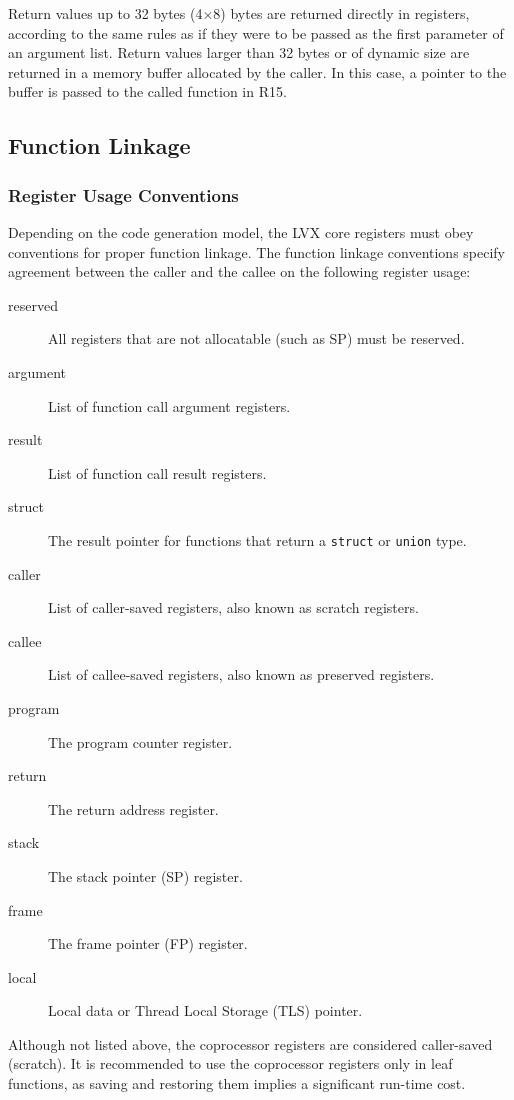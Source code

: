 Return values up to 32 bytes (4$\times$8) bytes are returned directly in
registers, according to the same rules as if they were to be passed as the first
parameter of an argument list. Return values larger than 32 bytes or of dynamic
size are returned in a memory buffer allocated by the caller. In this case, a
pointer to the buffer is passed to the called function in R15.


\subsection{Function Linkage}

\subsubsection{Register Usage Conventions}

Depending on the code generation model, the LVX core registers must
obey conventions for proper function linkage. The function linkage
conventions specify agreement between the caller and the callee on the following
register usage: \begin{description}
\item[reserved] All registers that are not allocatable (such as SP) must be reserved.
\item[argument] List of function call argument registers.
\item[result] List of function call result registers.
\item[struct] The result pointer for functions that return a \verb|struct| or \verb|union| type.
\item[caller] List of caller-saved registers, also known as scratch registers.
\item[callee] List of callee-saved registers, also known as preserved registers.
\item[program] The program counter register.
\item[return] The return address register.
\item[stack] The stack pointer (SP) register.
\item[frame] The frame pointer (FP) register.
\item[local] Local data or Thread Local Storage (TLS) pointer.
\end{description}
Although not listed above, the coprocessor registers are considered caller-saved
(scratch). It is recommended to use the coprocessor registers only in leaf
functions, as saving and restoring them implies a significant run-time cost.

